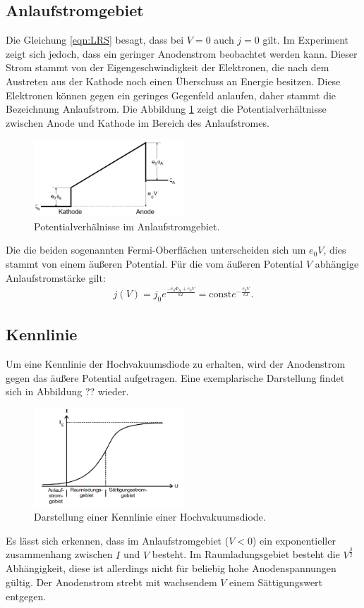 \subsection{Anlaufstromgebiet}
Die Gleichung \eqref{eqn:LRS} besagt, dass bei $V=0$ auch $j=0$ gilt. Im Experiment zeigt sich jedoch,
dass ein geringer Anodenstrom beobachtet werden kann. Dieser Strom stammt von der Eigengeschwindigkeit
der Elektronen, die nach dem Austreten aus der Kathode noch einen Überschuss an Energie besitzen.
Diese Elektronen können gegen ein geringes Gegenfeld anlaufen, daher stammt die Bezeichnung Anlaufstrom.
Die Abbildung \ref{fig:pv} zeigt die Potentialverhältnisse zwischen Anode und Kathode im Bereich des Anlaufstromes.
\begin{figure}
 \centering
 \includegraphics[width=0.5\textwidth]{pv.png}
 \caption{Potentialverhälnisse im Anlaufstromgebiet.\cite{sample}}
 \label{fig:pv}
 \end{figure}
Die die beiden sogenannten Fermi-Oberflächen unterscheiden sich um $e_\mathrm{0}V$, dies stammt von einem
äußeren Potential. Für die vom äußeren Potential $V$  abhängige Anlaufstromstärke gilt:
\begin{align}
j(V)=j_\mathrm{0}e^{\frac{-e_\mathrm{0}\Phi_\mathrm{A}+e_\mathrm{0}V}{kT}}=\mathrm{const}e^{-\frac{e_\mathrm{0}V}{kT}}\label{eqn:pot}.
\end{align}
\subsection{Kennlinie}
Um eine Kennlinie der Hochvakuumsdiode zu erhalten, wird der Anodenstrom gegen das äußere Potential
aufgetragen. Eine exemplarische Darstellung findet sich in Abbildung ?? wieder.
\begin{figure}
 \centering
 \includegraphics[width=0.5\textwidth]{kennlinie.png}
 \caption{Darstellung einer Kennlinie einer Hochvakuumsdiode.\cite{sample}}
 \label{fig:kennlinie}
 \end{figure}
Es lässt sich erkennen, dass im Anlaufstromgebiet ($V<0$) ein exponentieller zusammenhang
zwischen $I$ und $V$ besteht. Im Raumladungsgebiet besteht die $V^{\frac{3}{2}}$ Abhängigkeit, diese ist
allerdings nicht für beliebig hohe Anodenspannungen gültig. Der Anodenstrom strebt mit wachsendem $V$
einem Sättigungswert entgegen.
